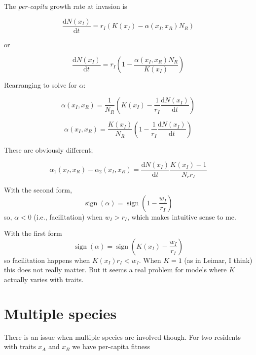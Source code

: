 \documentclass[10pt]{article}
\newcommand{\ud}{\ensuremath{\mathrm{d}}}
\newcommand{\sign}{\mathop{\mathrm{sign}}\nolimits}
\begin{document}
The \textit{per-capita} growth rate at invasion is

\begin{equation}
  \label{eq:v1}
  \frac{\ud N(x_I)}{\ud t} = r_I\left(K(x_I) - \alpha(x_I, x_R) N_R\right)
\end{equation}

or

\begin{equation}
  \label{eq:v2}
  \frac{\ud N(x_I)}{\ud t} =
  r_I\left(1 - \frac{\alpha(x_I, x_R) N_R}{K(x_I)}\right)
\end{equation}

Rearranging to solve for $\alpha$:

\begin{equation}
  \label{eq:a1}
  \alpha(x_I, x_R) = \frac{1}{N_R}
  \left(K(x_I) - \frac{1}{r_I}\frac{\ud N(x_I)}{\ud t}\right)
\end{equation}

\begin{equation}
  \label{eq:a2}
  \alpha(x_I, x_R) = \frac{K(x_I)}{N_R}
  \left(1 - \frac{1}{r_I}\frac{\ud N(x_I)}{\ud t}\right)
\end{equation}

These are obviously different;

\begin{equation*}
  \alpha_1(x_I, x_R) - \alpha_2(x_I, x_R) =
  \frac{\ud N(x_I)}{\ud t} \frac{K(x_I) - 1}{N_r r_I}
\end{equation*}

With the second form,
\begin{equation*}
  \sign(\alpha) = \sign\left(1 - \frac{w_I}{r_I}\right)
\end{equation*}
so, $\alpha < 0$ (i.e., facilitation) when $w_I > r_I$, which makes
intuitive sense to me.

With the first form
\begin{equation*}
  \sign(\alpha) = \sign\left(K(x_I) - \frac{w_I}{r_I}\right)
\end{equation*}
so facilitation happens when $K(x_I) r_I < w_I$.  When $K = 1$ (as in
Leimar, I think) this does not really matter.  But it seems a real
problem for models where $K$ actually varies with traits.

\section*{Multiple species}

There is an issue when multiple species are involved though.  For two
residents with traits $x_A$ and $x_B$ we have per-capita fitness
\end{document}
